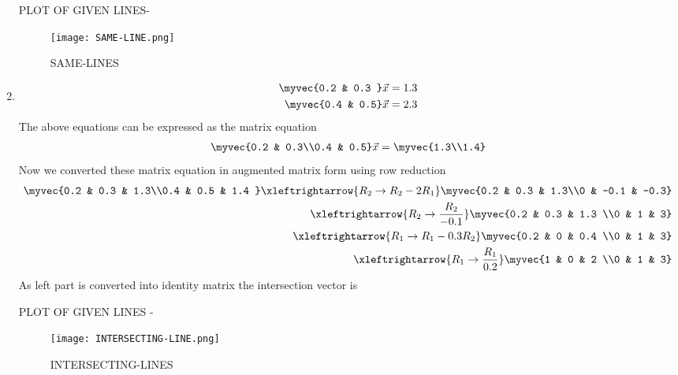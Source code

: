 \documentclass[journal,12pt,twocolumn]{IEEEtran}
\begin{document}
\begin{enumerate}
PLOT  OF GIVEN LINES-
\begin{figure}[ht!]
\centering
\texttt{[image: SAME-LINE.png]}
\caption{SAME-LINES}
\label{fig:SAME LINES.}
\end{figure} 
\item
\begin{align}
\begin{split}
\myvec{0.2 & 0.3 }\vec{x}&=1.3
\\
\myvec{0.4 & 0.5}\vec{x}&=2.3
\end{split}
\end{align}
The above equations can be expressed as the matrix equation
\begin{align}
\myvec{0.2 & 0.3\\0.4 & 0.5} \vec{x} = \myvec{1.3\\1.4}
\end{align}
%
Now we converted these matrix equation in augmented matrix form using row reduction
\begin{align}
\myvec{0.2 & 0.3 & 1.3\\0.4 & 0.5 & 1.4 } 
\xleftrightarrow {R_2\rightarrow R_2-2R_1}\myvec{0.2 & 0.3 & 1.3\\0 & -0.1 & -0.3} 
\\
\xleftrightarrow {R_2\rightarrow \frac{R_2}{-0.1}}\myvec{0.2 & 0.3 & 1.3 \\0 & 1 & 3}
\\
\xleftrightarrow {R_1\rightarrow R_1-0.3R_2}\myvec{0.2 & 0 & 0.4 \\0 & 1 & 3}
\\
\xleftrightarrow {R_1\rightarrow \frac{R_1}{0.2}}\myvec{1 & 0 & 2 \\0 & 1 & 3}
\end{align}
%
As left part is converted into identity matrix the intersection vector is 

PLOT OF GIVEN LINES -
\begin{figure}[ht!]
\centering
\texttt{[image: INTERSECTING-LINE.png]}
\caption{INTERSECTING-LINES}
\label{fig:INTERSECTING LINES.}
\end{figure} 
\end{enumerate}
\end{document}
